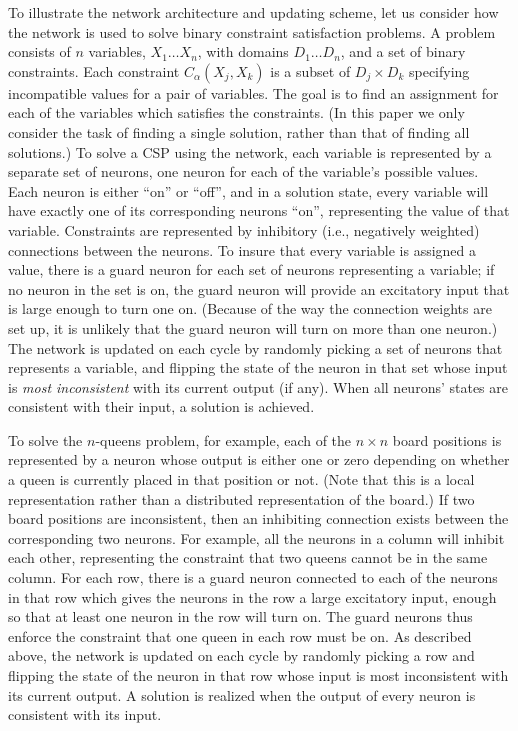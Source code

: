 \documentclass[twoside,12pt,titlepage,a4paper]{article}
\begin{document}
To illustrate the network architecture and updating scheme, let us
consider how the network is used to solve binary constraint
satisfaction problems.  A problem consists of $n$ variables,
$X_{1}\ldots X_{n}$, with domains $D_{1}\ldots D_{n}$, and a set of
binary constraints. Each constraint $C_{\alpha}(X_{j},X_{k})$ is a
subset of $D_{j} \times D_{k}$ specifying incompatible values for a
pair of variables. The goal is to find an assignment for each of the
variables which satisfies the constraints. (In this paper we only
consider the task of finding a single solution, rather than that of
finding all solutions.)  To solve a CSP using the network, each
variable is represented by a separate set of neurons, one neuron for
each of the variable's possible values.  Each neuron is either ``on''
or ``off'', and in a solution state, every variable will have exactly
one of its corresponding neurons ``on'', representing the value of
that variable.  Constraints are represented by inhibitory (i.e.,
negatively weighted) connections between the neurons.  To insure that
every variable is assigned a value, there is a guard neuron for each
set of neurons representing a variable; if no neuron in the set is on,
the guard neuron will provide an excitatory input that is large enough
to turn one on.  (Because of the way the connection weights are set up, it
is unlikely that the guard neuron will turn on more than one neuron.)
The network is updated on each cycle by randomly picking a set of
neurons that represents a variable, and flipping the state of the
neuron in that set whose input is {\em most inconsistent} with its
current output (if any).  When all neurons' states are consistent with
their input, a solution is achieved.

  To solve the $n$-queens problem, for example, each of the $n \times n$ board
positions is represented by a neuron whose output is either one or
zero depending on whether a queen is currently placed in that position
or not.  (Note that this is a local representation rather than a
distributed representation of the board.)  If two board positions are
inconsistent, then an inhibiting connection exists between the
corresponding two neurons.  For example, all the neurons in a column
will inhibit each other, representing the constraint that two queens
cannot be in the same column.  For each row, there is a guard neuron
connected to each of the neurons in that row which gives the neurons
in the row a large excitatory input, enough so that at least one
neuron in the row will turn on.  The guard neurons thus enforce the
constraint that one queen in each row must be on.  As described above,
the network is updated on each cycle by randomly picking a row and
flipping the state of the neuron in that row whose input is most
inconsistent with its current output. A solution is realized when the
output of every neuron is consistent with its input.
\end{document}

